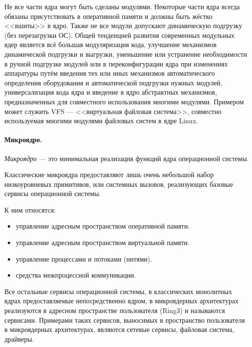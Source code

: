 Не все части ядра могут быть сделаны модулями. Некоторые части ядра всегда обязаны присутствовать в оперативной памяти и должны быть жёстко <<вшиты>> в ядро. Также не все модули допускают динамическую подгрузку (без перезагрузки ОС).
Общей тенденцией развития современных модульных ядер является всё большая модуляризация кода, улучшение механизмов динамической подгрузки и выгрузки, уменьшение или устранение необходимости в ручной подгрузке модулей или в переконфигурации ядра при изменениях аппаратуры путём введения тех или иных механизмов автоматического определения оборудования и автоматической подгрузки нужных модулей, универсализация кода ядра и введение в ядро абстрактных механизмов, предназначенных для совместного использования многими модулями. Примером может служить VFS --- <<виртуальная файловая система>>, совместно используемая многими модулями файловых систем в ядре Linux.

\paragraph{Микроядро.}\label{base:os:structure:kernel:types:microkernel} \emph{Микроядро} --- это минимальная реализация функций ядра операционной системы.

Классические микроядра предоставляют лишь очень небольшой набор низкоуровневых примитивов, или системных вызовов, реализующих базовые сервисы операционной системы.

К ним относятся:
\begin{itemize}
 \item управление адресным пространством оперативной памяти.
 \item управление адресным пространством виртуальной памяти.
 \item управление процессами и потоками (нитями).
 \item средства межпроцессной коммуникации.
\end{itemize}

Все остальные сервисы операционной системы, в классических монолитных ядрах предоставляемые непосредственно ядром, в микроядерных архитектурах реализуются в адресном пространстве пользователя (Ring3) и называются сервисами. Примерами таких сервисов, выносимых в пространство пользователя в микроядерных архитектурах, являются сетевые сервисы, файловая система, драйверы.

